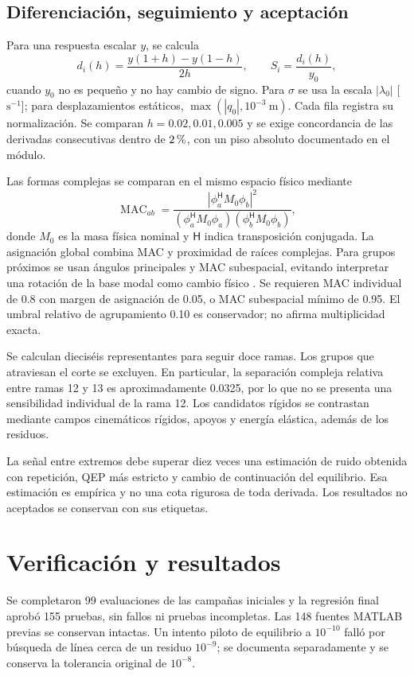 \subsection{Diferenciación, seguimiento y aceptación}
Para una respuesta escalar $y$, se calcula
\begin{equation}
d_i(h)=\frac{y(1+h)-y(1-h)}{2h},\qquad
S_i=\frac{d_i(h)}{y_0},
\end{equation}
cuando $y_0$ no es pequeño y no hay cambio de signo. Para $\sigma$ se usa la escala $|\lambda_0|$ [$\mathrm{s}^{-1}$]; para desplazamientos estáticos, $\max(|q_0|,10^{-3}\ \mathrm{m})$. Cada fila registra su normalización. Se comparan $h=0.02,0.01,0.005$ y se exige concordancia de las derivadas consecutivas dentro de $2\,\text{\char37}$, con un piso absoluto documentado en el módulo.

Las formas complejas se comparan en el mismo espacio físico mediante
\begin{equation}
\operatorname{MAC}_{ab}=\frac{|\phi_a^{\mathsf H}M_0\phi_b|^2}
{(\phi_a^{\mathsf H}M_0\phi_a)(\phi_b^{\mathsf H}M_0\phi_b)},
\end{equation}
donde $M_0$ es la masa física nominal y $\mathsf H$ indica transposición conjugada. La asignación global combina MAC y proximidad de raíces complejas. Para grupos próximos se usan ángulos principales y MAC subespacial, evitando interpretar una rotación de la base modal como cambio físico \cite{allemang2003}. Se requieren MAC individual de 0.8 con margen de asignación de 0.05, o MAC subespacial mínimo de 0.95. El umbral relativo de agrupamiento 0.10 es conservador; no afirma multiplicidad exacta.

Se calculan dieciséis representantes para seguir doce ramas. Los grupos que atraviesan el corte se excluyen. En particular, la separación compleja relativa entre ramas 12 y 13 es aproximadamente 0.0325, por lo que no se presenta una sensibilidad individual de la rama 12. Los candidatos rígidos se contrastan mediante campos cinemáticos rígidos, apoyos y energía elástica, además de los residuos.

La señal entre extremos debe superar diez veces una estimación de ruido obtenida con repetición, QEP más estricto y cambio de continuación del equilibrio. Esa estimación es empírica y no una cota rigurosa de toda derivada. Los resultados no aceptados se conservan con sus etiquetas.

\section{Verificación y resultados}
Se completaron 99 evaluaciones de las campañas iniciales y la regresión final aprobó 155 pruebas, sin fallos ni pruebas incompletas. Las 148 fuentes MATLAB previas se conservan intactas. Un intento piloto de equilibrio a $10^{-10}$ falló por búsqueda de línea cerca de un residuo $10^{-9}$; se documenta separadamente y se conserva la tolerancia original de $10^{-8}$.

